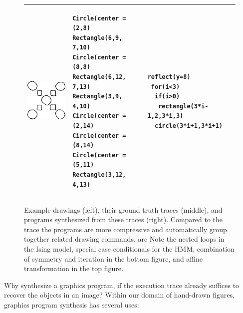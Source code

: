 \documentclass{article}
\newcommand{\remark}[1]{\textcolor{red}{[#1]}}
\begin{document}
\begin{figure}
\begin{tabular}{m{2.5cm}ll}
  \includegraphics[width = \exampleDrawingSize]{figures/expert-72-trim.png}&

\begin{minipage}{\exampleTraceSize}\begin{verbatim}
Circle(center = (2,8)
Rectangle(6,9, 7,10)
Circle(center = (8,8)
Rectangle(6,12, 7,13)
Rectangle(3,9, 4,10)
Circle(center = (2,14)
Circle(center = (8,14)
Circle(center = (5,11)
Rectangle(3,12, 4,13)
\end{verbatim}
  \end{minipage}&\begin{minipage}{\exampleProgramSize}
\begin{verbatim}
reflect(y=8)
 for(i<3)
  if(i>0)
   rectangle(3*i-1,2,3*i,3)
  circle(3*i+1,3*i+1)
\end{verbatim}
\end{minipage}\\\bottomrule
  \end{tabular}
  \caption{Example drawings (left), their ground truth traces (middle), and programs synthesized from these traces (right). Compared to the trace the programs are more compressive and automatically group together related drawing commands. are Note the nested loops in the Ising model, special case conditionals for the HMM, combination of symmetry and iteration in the bottom figure, and affine transformation in the top figure.}\label{exampleSynthesisResults}
  \end{figure}

Why synthesize a graphics program,
if the execution trace already suffices to recover the objects in an image?
Within our domain of hand-drawn figures, graphics program synthesis has several uses:
\end{document}
